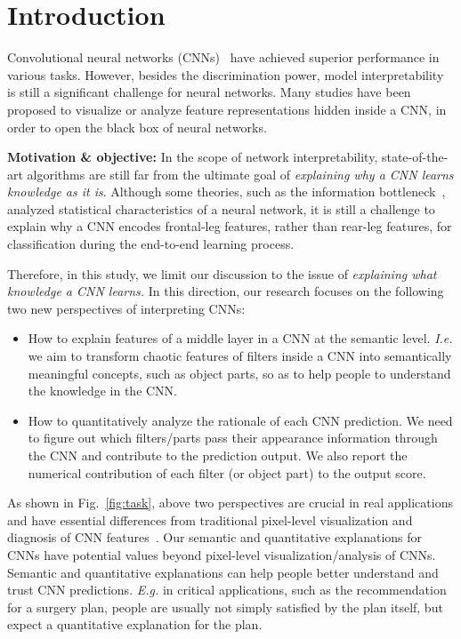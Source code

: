 \documentclass[10pt,twocolumn,letterpaper]{article}
\begin{document}
\section{Introduction}

Convolutional neural networks (CNNs)~\cite{CNN,CNNImageNet,ResNet} have achieved superior performance in various tasks. However, besides the discrimination power, model interpretability is still a significant challenge for neural networks. Many studies have been proposed to visualize or analyze feature representations hidden inside a CNN, in order to open the black box of neural networks.

\textbf{Motivation \& objective:} In the scope of network interpretability, state-of-the-art algorithms are still far from the ultimate goal of \textit{explaining why a CNN learns knowledge as it is}. Although some theories, such as the information bottleneck~\cite{InformationBottleneck}, analyzed statistical characteristics of a neural network, it is still a challenge to explain why a CNN encodes frontal-leg features, rather than rear-leg features, for classification during the end-to-end learning process.

Therefore, in this study, we limit our discussion to the issue of \textit{explaining what knowledge a CNN learns.} In this direction, our research focuses on the following two new perspectives of interpreting CNNs:
\begin{itemize}
\item How to explain features of a middle layer in a CNN at the semantic level. \emph{I.e.} we aim to transform chaotic features of filters inside a CNN into semantically meaningful concepts, such as object parts, so as to help people to understand the knowledge in the CNN.
\item How to quantitatively analyze the rationale of each CNN prediction. We need to figure out which filters/parts pass their appearance information through the CNN and contribute to the prediction output. We also report the numerical contribution of each filter (or object part) to the output score.
\end{itemize}
As shown in Fig.~\ref{fig:task}, above two perspectives are crucial in real applications and have essential differences from traditional pixel-level visualization and diagnosis of CNN features~\cite{CNNVisualization_1,CNNVisualization_2,FeaVisual,trust,shap}. Our semantic and quantitative explanations for CNNs have potential values beyond pixel-level visualization/analysis of CNNs. Semantic and quantitative explanations can help people better understand and trust CNN predictions. \emph{E.g.} in critical applications, such as the recommendation for a surgery plan, people are usually not simply satisfied by the plan itself, but expect a quantitative explanation for the plan.
\end{document}
